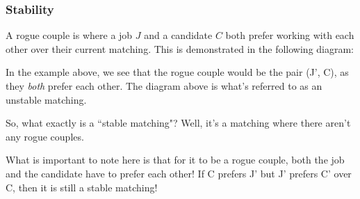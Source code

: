 \documentclass[openany]{book}
\begin{document}
\subsubsection{Stability}
\begin{defn}
	A rogue couple is where a job $J$ and a candidate $C$ both prefer working with each other over their current matching. This is demonstrated in the following diagram:
	
	\begin{center}
	\end{center}

	In the example above, we see that the rogue couple would be the pair (J', C), as they \textit{both} prefer each other. The diagram above is what's referred to as an unstable matching.
\end{defn}

So, what exactly is a ``stable matching"? Well, it's a matching where there aren't any rogue couples.

What is important to note here is that for it to be a rogue couple, both the job and the candidate have to prefer each other! If C prefers J' but J' prefers C' over C, then it is still a stable matching!
\end{document}
